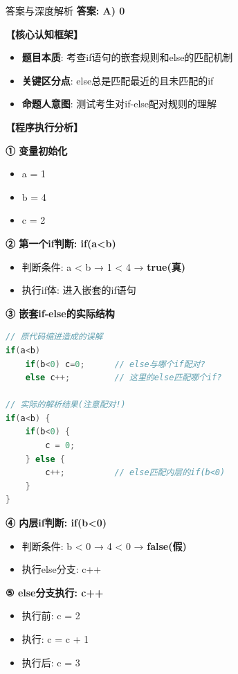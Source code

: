 \documentclass[a4paper,12pt]{article}
\begin{document}
\begin{bluebox}{答案与深度解析}
	\textbf{答案: A) 0}

	\textbf{【核心认知框架】}
	\begin{itemize}[leftmargin=*, nosep]
		\item \textbf{题目本质}: 考查if语句的嵌套规则和else的匹配机制
		\item \textbf{关键区分点}: else总是匹配最近的且未匹配的if
		\item \textbf{命题人意图}: 测试考生对if-else配对规则的理解
	\end{itemize}

	\textbf{【程序执行分析】}

	\textbf{① 变量初始化}
	\begin{itemize}[leftmargin=*, nosep]
		\item a = 1
		\item b = 4
		\item c = 2
	\end{itemize}

	\textbf{② 第一个if判断: if(a<b)}
	\begin{itemize}[leftmargin=*, nosep]
		\item 判断条件: a < b → 1 < 4 → \textbf{true(真)}
		\item 执行if体: 进入嵌套的if语句
	\end{itemize}

	\textbf{③ 嵌套if-else的实际结构}
	\begin{lstlisting}[language=C]
// 原代码缩进造成的误解
if(a<b)
    if(b<0) c=0;      // else与哪个if配对?
    else c++;         // 这里的else匹配哪个if?

// 实际的解析结果(注意配对!)
if(a<b) {
    if(b<0) {
        c = 0;
    } else {
        c++;          // else匹配内层的if(b<0)
    }
}
\end{lstlisting}

	\textbf{④ 内层if判断: if(b<0)}
	\begin{itemize}[leftmargin=*, nosep]
		\item 判断条件: b < 0 → 4 < 0 → \textbf{false(假)}
		\item 执行else分支: c++
	\end{itemize}

	\textbf{⑤ else分支执行: c++}
	\begin{itemize}[leftmargin=*, nosep]
		\item 执行前: c = 2
		\item 执行: c = c + 1
		\item 执行后: c = 3
	\end{itemize}


\end{bluebox}
\end{document}
